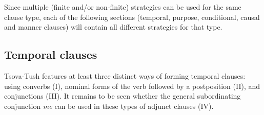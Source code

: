 Since multiple (finite and/or non-finite) strategies can be used for the same clause type, each of the following sections (temporal, purpose, conditional, causal and manner clauses) will contain all different strategies for that type.

\subsection{Temporal clauses}\label{temp}

Tsova-Tush features at least three distinct ways of forming temporal clauses: using converbs (I), nominal forms of the verb followed by a postposition (II), and conjunctions (III). It remains to be seen whether the general subordinating conjunction \textit{me} can be used in these types of adjunct clauses (IV). 

